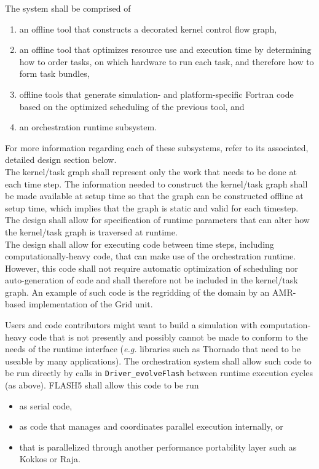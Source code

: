 \documentclass{article}
\begin{document}
\begin{req}
The system shall be comprised of
\begin{enumerate}
\item{an offline tool that constructs a decorated kernel control flow graph,}
\item{an offline tool that optimizes resource use and execution time by
determining how to order tasks, on which hardware to run each task, and
therefore how to form task bundles,}
\item{offline tools that generate simulation- and platform-specific Fortran code
based on the optimized scheduling of the previous tool, and}
\item{an orchestration runtime subsystem.}
\end{enumerate}
\end{req}
For more information regarding each of these subsystems, refer to its
associated, detailed design section below.\\

The kernel/task graph shall represent only the work that needs to be done at
each time step.  The information needed to construct the kernel/task graph shall
be made available at setup time so that the graph can be constructed offline at
setup time, which implies that the graph is static and valid for each
timestep.\\

The design shall allow for specification of runtime parameters that can alter
how the kernel/task graph is traversed at runtime.\\

The design shall allow for executing code between time steps, including
computationally-heavy code, that can make use of the orchestration runtime.
However, this code shall not require automatic optimization of scheduling nor
auto-generation of code and shall therefore not be included in the kernel/task
graph.  An example of such code is the regridding of the domain by an AMR-based
implementation of the Grid unit.\\

\begin{req}
Users and code contributors might want to build a simulation with
computation-heavy code that is not presently and possibly cannot be made to
conform to the needs of the runtime interface (\textit{e.g.} libraries such as
Thornado that need to be useable by many applications).  The orchestration
system shall allow such code to be run directly by calls in
\texttt{Driver\_evolveFlash} between runtime execution cycles (as above).
FLASH5 shall allow this code to be run
\begin{itemize}
\item{as serial code,}
\item{as code that manages and coordinates parallel execution internally, or}
\item{that is parallelized through another performance portability layer such as
Kokkos or Raja.}
\end{itemize}
\end{req}
\end{document}

